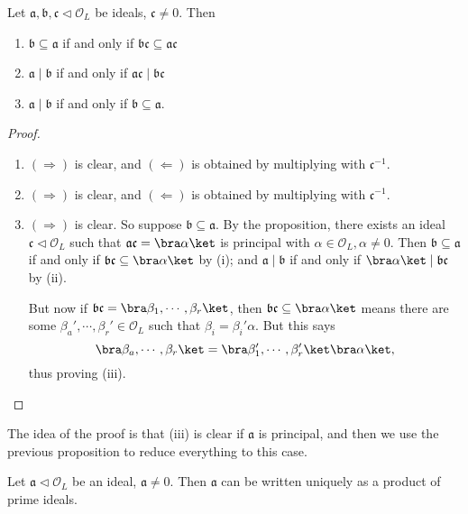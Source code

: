 \documentclass[a4paper]{article}
\begin{document}
\begin{cor}
  Let $\mathfrak{a}, \mathfrak{b}, \mathfrak{c}\lhd \mathcal{O}_L$ be ideals, $\mathfrak{c} \not= 0$. Then
  \begin{enumerate}
    \item $\mathfrak{b} \subseteq \mathfrak{a}$ if and only if $\mathfrak{b}\mathfrak{c} \subseteq \mathfrak{a}\mathfrak{c}$
    \item $\mathfrak{a} \mid \mathfrak{b}$ if and only if $\mathfrak{a} \mathfrak{c} \mid \mathfrak{b}\mathfrak{c}$
    \item $\mathfrak{a} \mid \mathfrak{b}$ if and only if $\mathfrak{b} \subseteq \mathfrak{a}$.
  \end{enumerate}
\end{cor}

\begin{proof}\leavevmode
  \begin{enumerate}
    \item $(\Rightarrow)$ is clear, and $(\Leftarrow)$ is obtained by multiplying with $\mathfrak{c}^{-1}$.
    \item $(\Rightarrow)$ is clear, and $(\Leftarrow)$ is obtained by multiplying with $\mathfrak{c}^{-1}$.
    \item $(\Rightarrow)$ is clear. So suppose $\mathfrak{b} \subseteq \mathfrak{a}$. By the proposition, there exists an ideal $\mathfrak{c} \lhd \mathcal{O}_L$ such that $\mathfrak{a}\mathfrak{c} = \bra \alpha\ket$ is principal with $\alpha \in \mathcal{O}_L, \alpha \not= 0$. Then $\mathfrak{b}\subseteq \mathfrak{a}$ if and only if $\mathfrak{b}\mathfrak{c} \subseteq \bra \alpha\ket$ by (i); and $\mathfrak{a} \mid \mathfrak{b}$ if and only if $\bra \alpha\ket \mid \mathfrak{b}\mathfrak{c}$ by (ii).

      But now if $\mathfrak{b}\mathfrak{c} = \bra \beta_1, \cdots, \beta_r\ket$, then $\mathfrak{b}\mathfrak{c} \subseteq \bra \alpha\ket$ means there are some $\beta_a', \cdots, \beta_r' \in \mathcal{O}_L$ such that $\beta_i = \beta_i' \alpha$. But this says
      \[
        \bra \beta_a, \cdots, \beta_r\ket = \bra \beta_1', \cdots, \beta_r' \ket \bra \alpha\ket,
      \]
      thus proving (iii).
  \end{enumerate}
\end{proof}
The idea of the proof is that (iii) is clear if $\mathfrak{a}$ is principal, and then we use the previous proposition to reduce everything to this case.

\begin{thm}
  Let $\mathfrak{a} \lhd \mathcal{O}_L$ be an ideal, $\mathfrak{a} \not= 0$. Then $\mathfrak{a}$ can be written uniquely as a product of prime ideals.
\end{thm}
\end{document}

